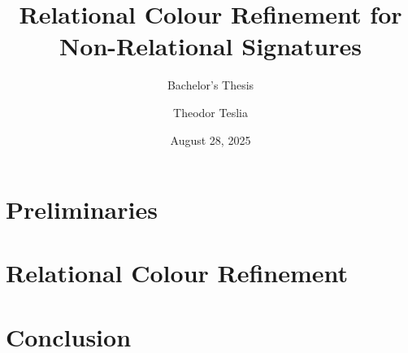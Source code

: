 \documentclass[a4paper,11pt,DIV=15]{scrartcl} %
\theoremstyle{plain}
\theoremstyle{definition}
\begin{document}
\subtitle{Bachelor's Thesis}
\date{August 28, 2025}
\publishers{RWTH Aachen University}	%

\title{Relational Colour Refinement for Non-Relational Signatures}

\author{Theodor Teslia}

\maketitle


\begin{abstract}
\end{abstract}

\thispagestyle{empty}

\clearpage





\section{Preliminaries}

\section{Relational Colour Refinement}







\section{Conclusion}



\clearpage



\end{document}

